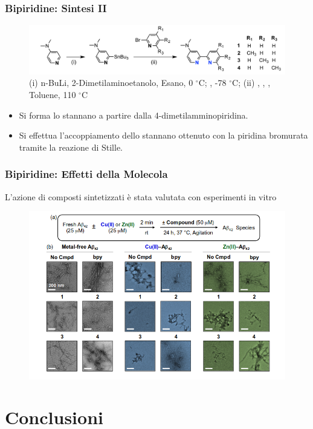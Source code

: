 \documentclass[9pt]{beamer}
\begin{document}
\begin{frame}
	\frametitle{Bipiridine: Sintesi II}
	\begin{figure}
		\includegraphics[width=\textwidth]{immagini/rea_g.png}
		{\caption*{\footnotesize{(i) n-BuLi, 2-Dimetilaminoetanolo, Esano, 0 $^\circ$C; , -78 $^\circ$C; (ii) , , , Toluene, 110 $^\circ$C}}}
	\end{figure}
	\begin{itemize}
		\item Si forma lo stannano a partire dalla 4-dimetilamminopiridina.
		\item Si effettua l'accoppiamento dello stannano ottenuto con la piridina bromurata tramite la reazione di Stille.
	\end{itemize}
	
	
\end{frame}

\begin{frame}
	\frametitle{Bipiridine: Effetti della Molecola}
	L'azione di composti sintetizzati è stata valutata con esperimenti in vitro
	
	\begin{figure}
		\includegraphics[width=\textwidth]{immagini/ris_bpy2.png}
	\end{figure}
\end{frame}

\section{Conclusioni}
\end{document}

